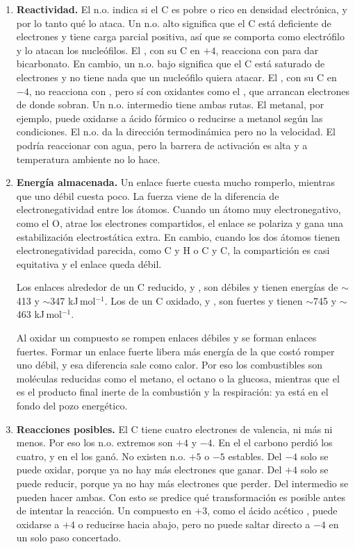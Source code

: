 \begin{enumerate}
    \item \textbf{Reactividad.} El n.o. indica si el C es pobre o rico en 
    densidad electrónica, y por lo tanto qué lo ataca. Un n.o. alto 
    significa que el C está deficiente de electrones y tiene carga parcial 
    positiva, así que se comporta como electrófilo y lo atacan los 
    nucleófilos. El , con su C en $+4$, reacciona con 
     para dar bicarbonato. En cambio, un n.o. 
    bajo significa que el C está saturado de electrones y no tiene nada 
    que un nucleófilo quiera atacar. El , con su C en $-4$, no 
    reacciona con , pero sí con oxidantes como 
    el , que arrancan electrones de donde sobran. Un n.o. intermedio 
    tiene ambas rutas. El metanal, por ejemplo, puede oxidarse a ácido 
    fórmico o reducirse a metanol según las condiciones. El n.o. da la 
    dirección termodinámica pero no la velocidad. El  podría 
    reaccionar con agua, pero la barrera de activación es alta y a 
    temperatura ambiente no lo hace.

    \item \textbf{Energía almacenada.} Un enlace fuerte cuesta mucho 
    romperlo, mientras que uno débil cuesta poco. La fuerza viene de la 
    diferencia de electronegatividad entre los átomos. Cuando un átomo muy 
    electronegativo, como el O, atrae los electrones compartidos, el enlace 
    se polariza y gana una estabilización electrostática extra. En cambio, 
    cuando los dos átomos tienen electronegatividad parecida, como C y H o 
    C y C, la compartición es casi equitativa y el enlace queda débil.

    Los enlaces alrededor de un C reducido,  y , son 
    débiles y tienen energías de $\sim$413 y $\sim$347 kJ\,mol$^{-1}$. 
    Los de un C oxidado,  y , son fuertes y tienen 
    $\sim$745 y $\sim$463 kJ\,mol$^{-1}$.

    Al oxidar un compuesto se rompen enlaces débiles y se forman enlaces 
    fuertes. Formar un enlace fuerte libera más energía de la que costó 
    romper uno débil, y esa diferencia sale como calor. Por eso los 
    combustibles son moléculas reducidas como el metano, el octano o la 
    glucosa, mientras que el  es el producto final inerte de la 
    combustión y la respiración: ya está en el fondo del pozo energético.

    \item \textbf{Reacciones posibles.} El C tiene cuatro electrones de 
    valencia, ni más ni menos. Por eso los n.o. extremos son $+4$ y $-4$. 
    En el  el carbono perdió los cuatro, y en el  los 
    ganó. No existen n.o. $+5$ o $-5$ estables. Del $-4$ solo se puede 
    oxidar, porque ya no hay más electrones que ganar. Del $+4$ solo se 
    puede reducir, porque ya no hay más electrones que perder. Del 
    intermedio se pueden hacer ambas. Con esto se predice qué transformación 
    es posible antes de intentar la reacción. Un compuesto en $+3$, como 
    el ácido acético , puede oxidarse a $+4$ o reducirse 
    hacia abajo, pero no puede saltar directo a $-4$ en un solo paso 
    concertado.


\end{enumerate}
